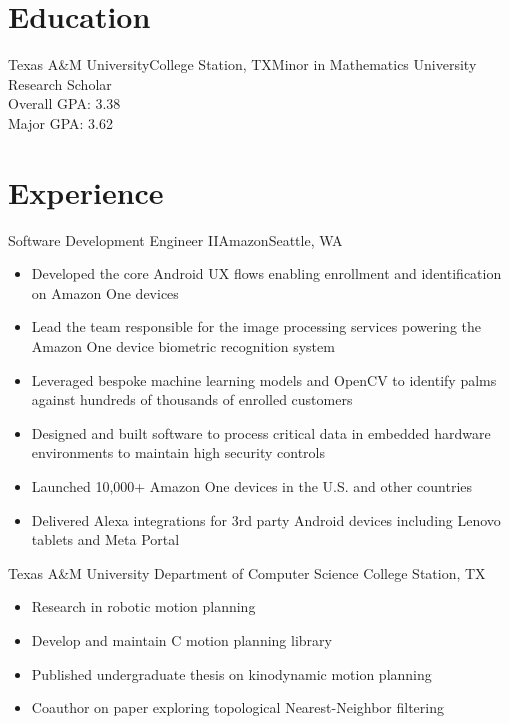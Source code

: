 \documentclass[11pt,a4paper,sans]{moderncv}
\newcommand{\Rplus}{\protect\hspace{-.1em}\protect\raisebox{.35ex}{\smaller{\smaller\textbf{+}}}}
\newcommand{\Cpp}{\mbox{C\Rplus\Rplus}\xspace}
\newcommand{\spacing}{4pt}
\begin{document}
\makecvtitle

\vspace{-2em}


\section{Education}

\vspace{\spacing}

    {Texas A\&M University}{College Station, TX}{Minor in Mathematics}
    {University Research Scholar \\ Overall GPA: 3.38 \\ Major GPA: 3.62}

\section{Experience}

\vspace{\spacing}

  {Software Development Engineer II}{Amazon}{Seattle, WA}{}
    {\vspace{3pt}
    \begin{itemize}
      \item Developed the core Android UX flows enabling enrollment and identification on Amazon One devices
      \item Lead the team responsible for the image processing services powering the Amazon One device biometric recognition system
      \item Leveraged bespoke machine learning models and OpenCV to identify palms against hundreds of thousands of enrolled customers
      \item Designed and built software to process critical data in embedded hardware environments to maintain high security controls
      \item Launched 10,000+ Amazon One devices in the U.S. and other countries
      \item Delivered Alexa integrations for 3rd party Android devices including Lenovo tablets and Meta Portal
    \end{itemize}
    }

\vspace{\spacing}

  {Texas A\&M University Department of Computer Science}
    {College Station, TX}{}{\vspace{3pt}
    \begin{itemize}
      \item Research in robotic motion planning
      \item Develop and maintain \Cpp motion planning library
      \item Published undergraduate thesis on kinodynamic motion planning
      \item Coauthor on paper exploring topological Nearest-Neighbor filtering
    \end{itemize}
    }
\end{document}
